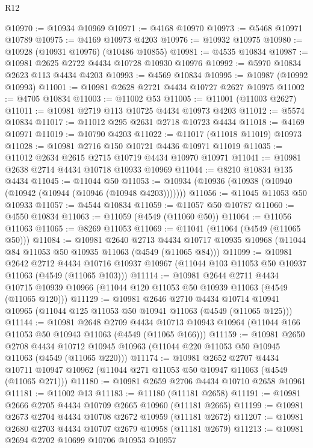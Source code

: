 \begin{lexlean}{R12}
\begin{coremodule}
@10970 := @10934 @10969
@10971 := @4168 @10970
@10973 := @5468 @10971 @10789
@10975 := @4169 @10973 @4203
@10976 := @10932 @10975
@10980 := @10928 (@10931 @10976) (@10486 @10855)
@10981 := @4535 @10834
@10987 := @10981 @2625 @2722 @4434 @10728 @10930 @10976
@10992 := @5970 @10834 @2623 @113 @4434 @4203
@10993 := @4569 @10834
@10995 := @10987 (@10992 @10993)
@11001 := @10981 @2628 @2721 @4434 @10727 @2627 @10975
@11002 := @4705 @10834
@11003 := @11002 @53
@11005 := @11001 (@11003 @2627)
@11011 := @10981 @2719 @113 @10725 @4434 @10973 @4203
@11012 := @5574 @10834
@11017 := @11012 @295 @2631 @2718 @10723 @4434
@11018 := @4169 @10971
@11019 := @10790 @4203
@11022 := @11017 (@11018 @11019) @10973
@11028 := @10981 @2716 @150 @10721 @4436 @10971 @11019
@11035 := @11012 @2634 @2615 @2715 @10719 @4434 @10970 @10971
@11041 := @10981 @2638 @2714 @4434 @10718 @10933 @10969
@11044 := @8210 @10834 @135 @4434
@11045 := @11044 @50
@11053 := @10934 (@10936 (@10938 (@10940 (@10942 (@10944 (@10946 (@10948 @4203)))))))
@11056 := @11045 @11053 @50 @10933
@11057 := @4544 @10834
@11059 := @11057 @50 @10787
@11060 := @4550 @10834
@11063 := @11059 (@4549 (@11060 @50))
@11064 := @11056 @11063
@11065 := @8269 @11053
@11069 := @11041 (@11064 (@4549 (@11065 @50)))
@11084 := @10981
    @2640
    @2713
    @4434
    @10717
    @10935
    @10968
    (@11044 @84 @11053 @50 @10935 @11063 (@4549 (@11065 @84)))
@11099 := @10981
    @2642
    @2712
    @4434
    @10716
    @10937
    @10967
    (@11044 @103 @11053 @50 @10937 @11063 (@4549 (@11065 @103)))
@11114 := @10981
    @2644
    @2711
    @4434
    @10715
    @10939
    @10966
    (@11044 @120 @11053 @50 @10939 @11063 (@4549 (@11065 @120)))
@11129 := @10981
    @2646
    @2710
    @4434
    @10714
    @10941
    @10965
    (@11044 @125 @11053 @50 @10941 @11063 (@4549 (@11065 @125)))
@11144 := @10981
    @2648
    @2709
    @4434
    @10713
    @10943
    @10964
    (@11044 @166 @11053 @50 @10943 @11063 (@4549 (@11065 @166)))
@11159 := @10981
    @2650
    @2708
    @4434
    @10712
    @10945
    @10963
    (@11044 @220 @11053 @50 @10945 @11063 (@4549 (@11065 @220)))
@11174 := @10981
    @2652
    @2707
    @4434
    @10711
    @10947
    @10962
    (@11044 @271 @11053 @50 @10947 @11063 (@4549 (@11065 @271)))
@11180 := @10981 @2659 @2706 @4434 @10710 @2658 @10961
@11181 := @11002 @13
@11183 := @11180 (@11181 @2658)
@11191 := @10981 @2666 @2705 @4434 @10709 @2665 @10960 (@11181 @2665)
@11199 := @10981 @2673 @2704 @4434 @10708 @2672 @10959 (@11181 @2672)
@11207 := @10981 @2680 @2703 @4434 @10707 @2679 @10958 (@11181 @2679)
@11213 := @10981 @2694 @2702 @10699 @10706 @10953 @10957

\end{coremodule}
\end{lexlean}
